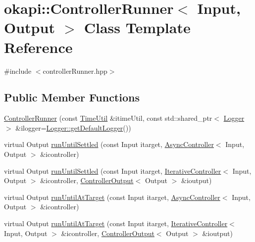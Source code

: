 \hypertarget{classokapi_1_1ControllerRunner}{}\section{okapi\+::Controller\+Runner$<$ Input, Output $>$ Class Template Reference}
\label{classokapi_1_1ControllerRunner}


{\ttfamily \#include $<$controller\+Runner.\+hpp$>$}

\subsection*{Public Member Functions}
\begin{DoxyCompactItemize}
\item 
\mbox{\hyperlink{classokapi_1_1ControllerRunner_a48f341d8073ec533b09307d48b719bb7}{Controller\+Runner}} (const \mbox{\hyperlink{classokapi_1_1TimeUtil}{Time\+Util}} \&itime\+Util, const std\+::shared\+\_\+ptr$<$ \mbox{\hyperlink{classokapi_1_1Logger}{Logger}} $>$ \&ilogger=\mbox{\hyperlink{classokapi_1_1Logger_a5053cf778b4b55acba788a3797dc96d2}{Logger\+::get\+Default\+Logger}}())
\item 
virtual Output \mbox{\hyperlink{classokapi_1_1ControllerRunner_aaab33207b895fe8d2d3f1533a9ad1446}{run\+Until\+Settled}} (const Input itarget, \mbox{\hyperlink{classokapi_1_1AsyncController}{Async\+Controller}}$<$ Input, Output $>$ \&icontroller)
\item 
virtual Output \mbox{\hyperlink{classokapi_1_1ControllerRunner_ab419d2bf6bccca115380467df452d6ca}{run\+Until\+Settled}} (const Input itarget, \mbox{\hyperlink{classokapi_1_1IterativeController}{Iterative\+Controller}}$<$ Input, Output $>$ \&icontroller, \mbox{\hyperlink{classokapi_1_1ControllerOutput}{Controller\+Output}}$<$ Output $>$ \&ioutput)
\item 
virtual Output \mbox{\hyperlink{classokapi_1_1ControllerRunner_ab1e85de9c843d4b946f3d8672bf47f51}{run\+Until\+At\+Target}} (const Input itarget, \mbox{\hyperlink{classokapi_1_1AsyncController}{Async\+Controller}}$<$ Input, Output $>$ \&icontroller)
\item 
virtual Output \mbox{\hyperlink{classokapi_1_1ControllerRunner_af9654dd06bf58274b7cbcfd84813193a}{run\+Until\+At\+Target}} (const Input itarget, \mbox{\hyperlink{classokapi_1_1IterativeController}{Iterative\+Controller}}$<$ Input, Output $>$ \&icontroller, \mbox{\hyperlink{classokapi_1_1ControllerOutput}{Controller\+Output}}$<$ Output $>$ \&ioutput)
\end{DoxyCompactItemize}
